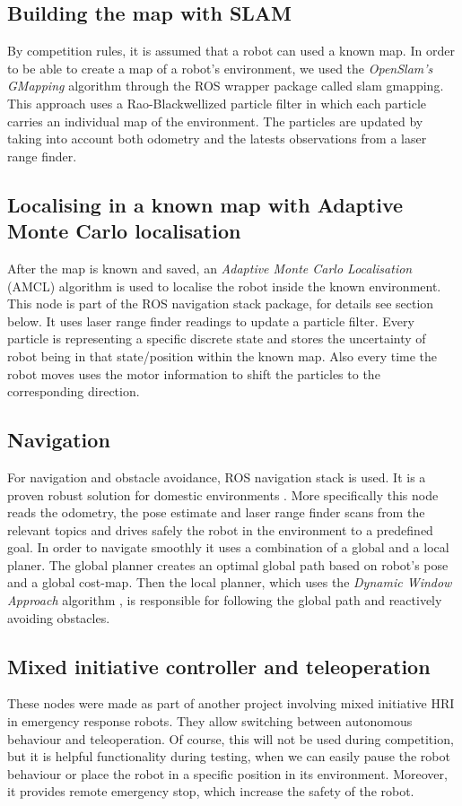 \documentclass[conference]{IEEEtran}
\begin{document}
\subsection{Building the map with SLAM}
By competition rules, it is assumed that a robot can used a known map. In order to be able to create a map of a robot's environment, we used the \textit{OpenSlam's GMapping} algorithm \cite{slam} through the ROS wrapper package called \textsf{slam gmapping}. This approach uses a Rao-Blackwellized particle filter in which each particle carries an individual map of the environment. The particles are updated by taking into account both odometry and the latests observations from a laser range finder.

\subsection{Localising in a known map with Adaptive Monte Carlo localisation}
After the map is known and saved, an \textit{Adaptive Monte Carlo Localisation} (AMCL)\cite{amcl} algorithm is used to localise the robot inside the known environment. This node is part of the ROS \textsf{navigation stack} package, for details see section below. It uses laser range finder readings to update a particle filter. Every particle is representing a specific discrete state and stores the uncertainty of robot being in that state/position within the known map. Also every time the robot moves uses the motor information to shift the particles to the corresponding direction.

\subsection{\label{sec:navig}Navigation}
For navigation and obstacle avoidance, ROS \textsf{navigation stack} is used. It is a proven robust solution for domestic environments \cite{Marder-Eppstein2010}. More specifically this node reads the odometry, the pose estimate and laser range finder scans from the relevant topics and drives safely the robot in the environment to a predefined goal. In order to navigate smoothly it uses a combination of a global and a local planer. The global planner creates an optimal global path based on robot's pose and a global cost-map. Then the local planner, which uses the \textit{Dynamic Window Approach} algorithm \cite{dwa}, is responsible for following the global path and reactively avoiding obstacles.

\subsection{Mixed initiative controller and teleoperation}
These nodes were made as part of another project involving mixed initiative HRI in emergency response robots. They allow switching between autonomous behaviour and teleoperation. Of course, this will not be used during competition, but it is helpful functionality during testing, when we can easily pause the robot behaviour or place the robot in a specific position in its environment. Moreover, it provides remote emergency stop, which increase the safety of the robot.
\end{document}
